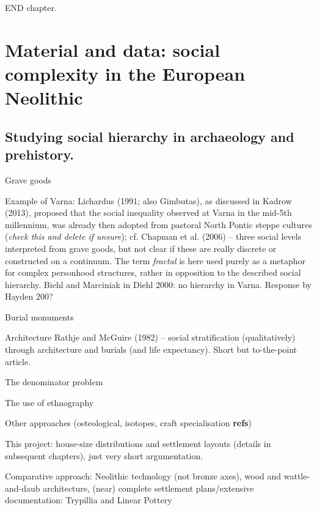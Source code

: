 \documentclass[
  12pt,
  a4paper, twoside]{book}
\begin{document}
END chapter.

\hypertarget{material}{%
\chapter{Material and data: social complexity in the European Neolithic}\label{material}}

\hypertarget{complexity-archaeo}{%
\section{Studying social hierarchy in archaeology and prehistory.}\label{complexity-archaeo}}

Grave goods

Example of Varna: Lichardus (1991; also Gimbutas), as discussed in Kadrow (2013), proposed that the social inequality observed at Varna in the mid-5th millennium, was already then adopted from pastoral North Pontic steppe cultures (\emph{check this and delete if unsure}); cf. Chapman et al. (2006) -- three social levels interpreted from grave goods, but not clear if these are really discrete or constructed on a continuum. The term \emph{fractal} is here used purely as a metaphor for complex personhood structures, rather in opposition to the described social hierarchy. Biehl and Marciniak in Diehl 2000: no hierarchy in Varna. Response by Hayden 200?

Burial monuments

Architecture Rathje and McGuire (1982) -- social stratification (qualitatively) through architecture and burials (and life expectancy). Short but to-the-point article.

The denominator problem

The use of ethnography

Other approaches (osteological, isotopes, craft specialisation \textbf{refs})

This project: house-size distributions and settlement layouts (details in subsequent chapters), just very short argumentation.

Comparative approach: Neolithic technology (not bronze axes), wood and wattle-and-daub architecture, (near) complete settlement plans/extensive documentation: Trypillia and Linear Pottery
\end{document}
